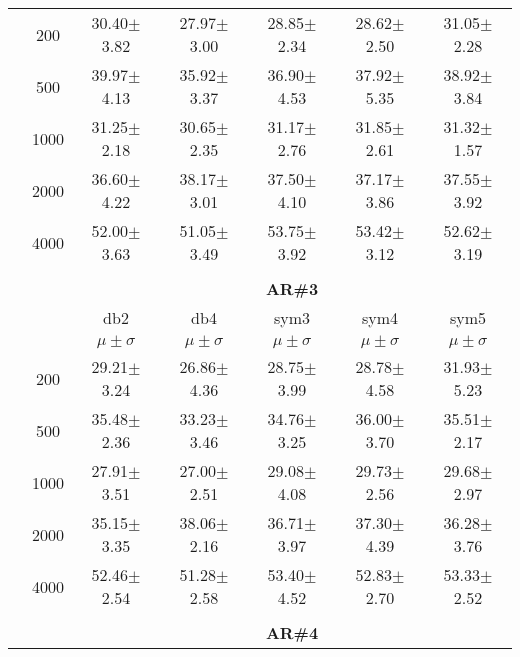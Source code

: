 \begin{table}[H]
\begin{tabular}{|c|c|c c c c c|}
\multicolumn{1}{|c|}{ \multirow{5}{*}{\rotatebox[origin=c]{90}{\textbf{Neurônios}}} }
&200	&30.40$\pm$3.82	&27.97$\pm$3.00	&28.85$\pm$2.34	&28.62$\pm$2.50	&31.05$\pm$2.28\\\cline{2-7}
&500	&39.97$\pm$4.13	&35.92$\pm$3.37 &36.90$\pm$4.53	&37.92$\pm$5.35	&38.92$\pm$3.84\\\cline{2-7}
&1000	&31.25$\pm$2.18	&30.65$\pm$2.35	&31.17$\pm$2.76	&31.85$\pm$2.61	&31.32$\pm$1.57\\\cline{2-7}
&2000	&36.60$\pm$4.22	&38.17$\pm$3.01	&37.50$\pm$4.10	&37.17$\pm$3.86	&37.55$\pm$3.92\\\cline{2-7}
&4000	&52.00$\pm$3.63	&51.05$\pm$3.49	&53.75$\pm$3.92	&53.42$\pm$3.12	&52.62$\pm$3.19



\\ \midrule
\multicolumn{7}{c}{}\\ 



\cline{3-7}
\multicolumn{2}{c|}{\multirow{3}{*}{}} & \multicolumn{5}{c|}{\textbf{AR\#3}}   \\\cline{3-7} 

\multicolumn{2}{c|}{}  & db2 & db4 & sym3 & sym4 & sym5 \\\cline{3-7}
\multicolumn{2}{c|}{}& $\mu \pm \sigma$ & $\mu \pm \sigma$ & $\mu \pm \sigma$ & $\mu \pm \sigma$ & $\mu \pm \sigma$ \\\hline

\multicolumn{1}{|c|}{ \multirow{5}{*}{\rotatebox[origin=c]{90}{\textbf{Neurônios}}} }
&200	&29.21$\pm$3.24	&26.86$\pm$4.36	&28.75$\pm$3.99	&28.78$\pm$4.58	&31.93$\pm$5.23\\\cline{2-7}
&500	&35.48$\pm$2.36	&33.23$\pm$3.46	&34.76$\pm$3.25	&36.00$\pm$3.70	&35.51$\pm$2.17\\\cline{2-7}
&1000	&27.91$\pm$3.51	&27.00$\pm$2.51	&29.08$\pm$4.08	&29.73$\pm$2.56	&29.68$\pm$2.97\\\cline{2-7}
&2000	&35.15$\pm$3.35	&38.06$\pm$2.16	&36.71$\pm$3.97	&37.30$\pm$4.39	&36.28$\pm$3.76\\\cline{2-7}
&4000	&52.46$\pm$2.54	&51.28$\pm$2.58	&53.40$\pm$4.52	&52.83$\pm$2.70	&53.33$\pm$2.52



\\\midrule 
\multicolumn{7}{c}{}\\ 



\cline{3-7}
\multicolumn{2}{c|}{\multirow{3}{*}{}} & \multicolumn{5}{c|}{\textbf{AR\#4}}   \\\cline{3-7} 


\end{tabular}
\end{table}
